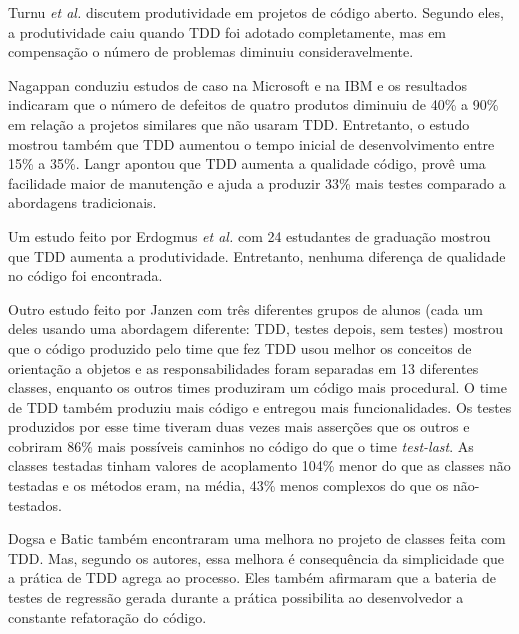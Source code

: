 Turnu \textit{et al.} \cite{turnu-tdd-opensouce} discutem produtividade em
projetos de código aberto. Segundo eles, a produtividade caiu quando TDD foi
adotado completamente, mas em compensação o número de problemas diminuiu 
consideravelmente.

Nagappan \cite{nagappan-ms} conduziu estudos de caso na Microsoft e na IBM e os
resultados indicaram que o número de defeitos de quatro produtos diminuiu de 
40\% a 90\% em relação a projetos similares que não usaram TDD. Entretanto, o 
estudo mostrou também que TDD aumentou o tempo inicial de desenvolvimento entre 15\%
a 35\%. Langr \cite{langr} apontou que TDD aumenta a qualidade código, provê uma 
facilidade maior de manutenção e ajuda a produzir 33\% mais testes comparado a
abordagens tradicionais.

Um estudo feito por Erdogmus \textit{et al.} \cite{erdogmus-morisio} com 24 estudantes de
graduação mostrou que TDD aumenta a produtividade. Entretanto, nenhuma diferença 
de qualidade no código foi encontrada.

Outro estudo feito por Janzen \cite{janzen-saiedian} com três diferentes grupos
de alunos (cada um deles usando uma abordagem diferente: TDD, testes depois, sem
testes) mostrou que o código produzido pelo time que fez TDD usou melhor os
conceitos de orientação a objetos e as responsabilidades foram separadas em 13 
diferentes classes, enquanto os outros times produziram um código mais
procedural. O time de TDD também produziu mais código e entregou mais
funcionalidades. Os testes produzidos por esse time tiveram duas vezes mais
asserções que os outros e cobriram 86\% mais possíveis caminhos no código 
do que o time \textit{test-last}. 
As classes testadas tinham valores de acoplamento 104\% menor do 
que as classes não testadas e os métodos eram, na média, 43\% menos complexos 
do que os não-testados.

Dogsa e Batic \cite{dogsa-batic} também encontraram uma melhora no
projeto de classes feita com TDD. Mas, segundo os autores, essa melhora é 
consequência da simplicidade que a prática de TDD agrega ao processo. Eles
também  afirmaram que a bateria de testes de regressão gerada durante a prática 
possibilita ao desenvolvedor a constante refatoração do código.

